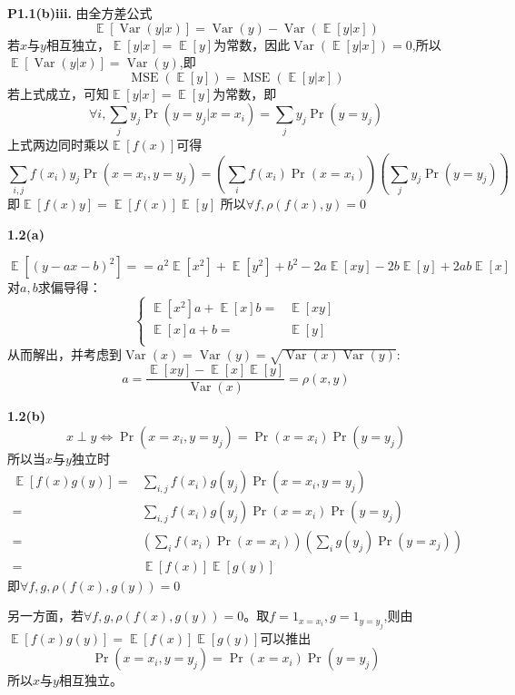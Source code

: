 \documentclass{article}
\DeclareMathOperator{\E}{\mathbb{E}}
\DeclareMathOperator{\Var}{Var}
\DeclareMathOperator{\MSE}{MSE}
\begin{document}
\textbf{P1.1(b)iii.}
由全方差公式
\begin{equation}
\E[\Var(y|x)]=\Var(y)-\Var(\E[y|x])
\end{equation}
若$x$与$y$相互独立，$\E[y|x]=\E[y]$为常数，因此$\Var(\E[y|x])=0$,所以$\E[\Var(y|x)]=\Var(y)$,即
\begin{equation}
\MSE(\E[y])=\MSE(\E[y|x])
\end{equation}
若上式成立，可知$\E[y|x]=\E[y]$为常数，即
\begin{equation}
\forall i,\sum_{j}y_j\Pr(y=y_j|x=x_i)=\sum_{j}y_j\Pr(y=y_j)
\end{equation}
上式两边同时乘以$\E[f(x)]$可得
\begin{equation}
\sum_{i,j}f(x_i)y_j\Pr(x=x_i,y=y_j)=\left(\sum_i f(x_i)\Pr(x=x_i)\right)\left(\sum_j y_j\Pr(y=y_j)\right)
\end{equation}
即$\E[f(x)y]=\E[f(x)]\E[y]$
所以$\forall f,\rho(f(x),y)=0$

\textbf{1.2(a)}

\begin{equation}
\E[(y-ax-b)^2]==a^2\E[x^2]+\E[y^2]+b^2-2a\E[xy]-2b\E[y]+2ab\E[x]
\end{equation}
对$a,b$求偏导得：
\begin{equation}
\begin{cases}
\E[x^2]a+\E[x]b=&\E[xy]\\
\E[x]a+b=&\E[y]\\
\end{cases}
\end{equation}
从而解出，并考虑到$\Var(x)=\Var(y)=\sqrt{\Var(x)\Var(y)}$:
\begin{equation}
a=\frac{\E[xy]-\E[x]\E[y]}{\Var(x)}=\rho(x,y)
\end{equation}

\textbf{1.2(b)}
\begin{equation}
x \perp y \Longleftrightarrow \Pr(x=x_i,y=y_j)=\Pr(x=x_i)\Pr(y=y_j)
\end{equation}
所以当$x$与$y$独立时
\begin{align*}
\E[f(x)g(y)]=&\sum_{i,j}f(x_i)g(y_j)\Pr(x=x_i,y=y_j)\\
=&\sum_{i,j}f(x_i)g(y_j)\Pr(x=x_i)\Pr(y=y_j)\\
=&\left(\sum_{i}f(x_i)\Pr(x=x_i)\right)\left(\sum_{i}g(y_j)\Pr(y=x_j)\right)\\
=&\E[f(x)]\E[g(y)]
\end{align*}
即$\forall f,g,\rho(f(x),g(y))=0$

另一方面，若$\forall f,g,\rho(f(x),g(y))=0$。取$f=1_{x=x_i},g=1_{y=y_j}$,则由
$\E[f(x)g(y)]=\E[f(x)]\E[g(y)]$可以推出
\begin{equation}
\Pr(x=x_i,y=y_j)=\Pr(x=x_i)\Pr(y=y_j)
\end{equation}
所以$x$与$y$相互独立。
\begin{equation}
\end{equation}
\begin{equation}
\end{equation}
\begin{equation}
\end{equation}
\begin{equation}
\end{equation}
\end{document}
